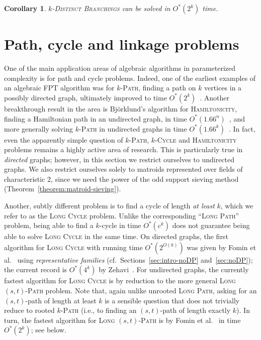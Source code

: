\documentclass[10pt,a4paper]{article}
\newtheorem{corollary}{Corollary}[section]
\begin{document}
\begin{corollary}
  \textsc{$k$-Distinct Branchings} can be solved in $O^*(2^k)$ time.
\end{corollary}

\section{Path, cycle and linkage problems}
\label{sec:paths-linkages}

One of the main application areas of algebraic algorithms in
parameterized complexity is for path and cycle problems. Indeed, one
of the earliest examples of an algebraic FPT algorithm was for
\textsc{$k$-Path}, finding a path on $k$ vertices in a possibly
directed graph, ultimately improved to time $O^*(2^k)$~\cite{Koutis08ICALP,Williams09IPL,KoutisW09limits}.
Another breakthrough result in the area is Björklund's algorithm for
\textsc{Hamiltonicity}, finding a Hamiltonian path in an undirected
graph, in time $O^*(1.66^n)$~\cite{Bjorklund14detsum},
and more generally solving \textsc{$k$-Path} in undirected graphs in
time $O^*(1.66^k)$~\cite{BjorklundHKK17narrow}.
In fact, even the apparently simple question of \textsc{$k$-Path},
\textsc{$k$-Cycle} and \textsc{Hamiltonicity} problems remains a
highly active area of research.
This is particularly true in \emph{directed} graphs; 
however, in this section we restrict ourselves to undirected graphs. 
We also restrict ourselves solely to matroids represented over fields
of characteristic 2, since we need the power of the odd support
sieving method (Theorem~\ref{theorem:matroid-sieving}). 

Another, subtly different problem is to find a cycle of length
\emph{at least} $k$, which we refer to as the \textsc{Long Cycle}
problem. Unlike the corresponding ``\textsc{Long Path}'' problem,
being able to find a $k$-cycle in time $O^*(c^k)$ does not guarantee 
being able to solve \textsc{Long Cycle} in the same time.
On directed graphs, the first algorithm for \textsc{Long Cycle}
with running time $O^*(2^{O(k)})$ was given by Fomin et al.~\cite{FominLPS16JACM}
using \emph{representative families} 
(cf.~Sections~\ref{sec:intro-noDP} and~\ref{sec:noDP});
the current record is $O^*(4^k)$ by Zehavi~\cite{Zehavi16ldc}.
For undirected graphs, the currently fastest algorithm for
\textsc{Long Cycle} is by reduction to the more general
\textsc{Long $(s,t)$-Path} problem. Note that, again unlike unrooted
\textsc{Long Path}, asking for an $(s,t)$-path of length at least $k$
is a sensible question that does not trivially reduce to rooted
\textsc{$k$-Path} (i.e., to finding an $(s,t)$-path of length exactly $k$).
In turn, the fastest algorithm for \textsc{Long $(s,t)$-Path}
is by Fomin et al.~\cite{FominGKSS24} in time $O^*(2^k)$; see below. 
\end{document}
